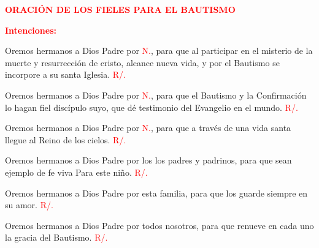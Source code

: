 \documentclass[12pt, letterpaper]{article}
\begin{document}
  \Large {\bfseries \textcolor{red}{ORACI\'ON DE LOS FIELES PARA EL BAUTISMO}}

  \large {\bfseries \textcolor{red}{Intenciones:}}

  \Large Oremos hermanos a Dios Padre por \textcolor{red}{N.}, para que al participar en el misterio de la muerte y resurrección de cristo, alcance nueva vida, y por el Bautismo se incorpore a su santa Iglesia. \textcolor{red}{R/.}

  \Large Oremos hermanos a Dios Padre por \textcolor{red}{N.}, para que el Bautismo y la Confirmación lo hagan fiel discípulo suyo, que dé testimonio del Evangelio en el mundo. \textcolor{red}{R/.}

  \Large Oremos hermanos a Dios Padre por \textcolor{red}{N.}, para que a través de una vida santa llegue al Reino de los cielos.
  \textcolor{red}{R/.}

  \Large Oremos hermanos a Dios Padre por los los padres y padrinos, para que sean ejemplo de fe viva Para este niño. \textcolor{red}{R/.}

  \Large Oremos hermanos a Dios Padre por esta familia, para que los guarde siempre en su amor. \textcolor{red}{R/.}

  \Large Oremos hermanos a Dios Padre por todos nosotros, para que renueve en cada uno la gracia del Bautismo. \textcolor{red}{R/.}
\end{document}
